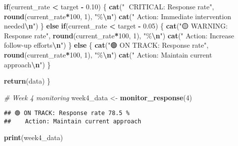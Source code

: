 \documentclass[
]{article}
\newenvironment{Shaded}{\begin{snugshade}}{\end{snugshade}}
\newcommand{\CommentTok}[1]{\textcolor[rgb]{0.56,0.35,0.01}{\textit{#1}}}
\newcommand{\ControlFlowTok}[1]{\textcolor[rgb]{0.13,0.29,0.53}{\textbf{#1}}}
\newcommand{\DecValTok}[1]{\textcolor[rgb]{0.00,0.00,0.81}{#1}}
\newcommand{\FloatTok}[1]{\textcolor[rgb]{0.00,0.00,0.81}{#1}}
\newcommand{\FunctionTok}[1]{\textcolor[rgb]{0.13,0.29,0.53}{\textbf{#1}}}
\newcommand{\NormalTok}[1]{#1}
\newcommand{\OtherTok}[1]{\textcolor[rgb]{0.56,0.35,0.01}{#1}}
\newcommand{\SpecialCharTok}[1]{\textcolor[rgb]{0.81,0.36,0.00}{\textbf{#1}}}
\newcommand{\StringTok}[1]{\textcolor[rgb]{0.31,0.60,0.02}{#1}}
\begin{document}
\begin{Shaded}
\begin{Highlighting}[]
  \ControlFlowTok{if}\NormalTok{(current\_rate }\SpecialCharTok{\textless{}}\NormalTok{ target }\SpecialCharTok{{-}} \FloatTok{0.10}\NormalTok{) \{}
    \FunctionTok{cat}\NormalTok{(}\StringTok{"🔴 CRITICAL: Response rate"}\NormalTok{, }\FunctionTok{round}\NormalTok{(current\_rate}\SpecialCharTok{*}\DecValTok{100}\NormalTok{, }\DecValTok{1}\NormalTok{), }\StringTok{"\%}\SpecialCharTok{\textbackslash{}n}\StringTok{"}\NormalTok{)}
    \FunctionTok{cat}\NormalTok{(}\StringTok{"   Action: Immediate intervention needed}\SpecialCharTok{\textbackslash{}n}\StringTok{"}\NormalTok{)}
\NormalTok{  \} }\ControlFlowTok{else} \ControlFlowTok{if}\NormalTok{(current\_rate }\SpecialCharTok{\textless{}}\NormalTok{ target }\SpecialCharTok{{-}} \FloatTok{0.05}\NormalTok{) \{}
    \FunctionTok{cat}\NormalTok{(}\StringTok{"🟡 WARNING: Response rate"}\NormalTok{, }\FunctionTok{round}\NormalTok{(current\_rate}\SpecialCharTok{*}\DecValTok{100}\NormalTok{, }\DecValTok{1}\NormalTok{), }\StringTok{"\%}\SpecialCharTok{\textbackslash{}n}\StringTok{"}\NormalTok{)}
    \FunctionTok{cat}\NormalTok{(}\StringTok{"   Action: Increase follow{-}up efforts}\SpecialCharTok{\textbackslash{}n}\StringTok{"}\NormalTok{)}
\NormalTok{  \} }\ControlFlowTok{else}\NormalTok{ \{}
    \FunctionTok{cat}\NormalTok{(}\StringTok{"🟢 ON TRACK: Response rate"}\NormalTok{, }\FunctionTok{round}\NormalTok{(current\_rate}\SpecialCharTok{*}\DecValTok{100}\NormalTok{, }\DecValTok{1}\NormalTok{), }\StringTok{"\%}\SpecialCharTok{\textbackslash{}n}\StringTok{"}\NormalTok{)}
    \FunctionTok{cat}\NormalTok{(}\StringTok{"   Action: Maintain current approach}\SpecialCharTok{\textbackslash{}n}\StringTok{"}\NormalTok{)}
\NormalTok{  \}}
  
  \FunctionTok{return}\NormalTok{(data)}
\NormalTok{\}}

\CommentTok{\# Week 4 monitoring}
\NormalTok{week4\_data }\OtherTok{\textless{}{-}} \FunctionTok{monitor\_response}\NormalTok{(}\DecValTok{4}\NormalTok{)}
\end{Highlighting}
\end{Shaded}

\begin{verbatim}
## 🟢 ON TRACK: Response rate 78.5 %
##    Action: Maintain current approach
\end{verbatim}

\begin{Shaded}
\begin{Highlighting}[]
\FunctionTok{print}\NormalTok{(week4\_data)}
\end{Highlighting}
\end{Shaded}
\end{document}

